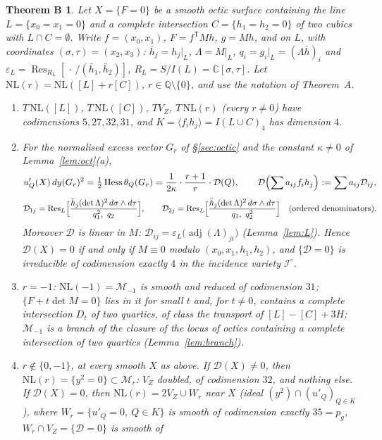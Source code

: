 \documentclass[11pt]{article}
\numberwithin{equation}{section}
\newtheorem*{thmB}{Theorem B}
\theoremstyle{remark}
\newcommand{\CC}{\mathbb{C}}
\newcommand{\QQ}{\mathbb{Q}}
\newcommand{\NL}{\mathrm{NL}}
\newcommand{\VZ}{V_Z}
\newcommand{\cD}{\mathcal{D}}
\newcommand{\cM}{\mathcal{M}}
\newcommand{\cI}{\mathcal{I}}
\newcommand{\Res}{\operatorname{Res}}
\newcommand{\Hess}{\operatorname{Hess}}
\newcommand{\adj}{\operatorname{adj}}
\begin{document}
\begin{thmB}
Let $X=\{F=0\}$ be a smooth octic surface containing the line $L=\{x_0=x_1=0\}$ and a complete intersection
$C=\{h_1=h_2=0\}$ of two cubics with $L\cap C=\emptyset$. Write $f=(x_0,x_1)$, $F=f^{\mathsf T}Mh$, $g=Mh$, and on
$L$, with coordinates $(\sigma,\tau)=(x_2,x_3)$: $\bar h_j=h_j|_L$, $\Lambda=M|_L$,
$q_i=g_i|_L=(\Lambda\bar h)_i$ and $\varepsilon_L=\Res_{R_L}[\,\cdot\,/(\bar h_1,\bar h_2)]$, $R_L=S/I(L)=\CC[\sigma,\tau]$. Let
$\NL(r)=\NL([L]+r[C])$, $r\in\QQ\setminus\{0\}$, and use the notation of Theorem~A.
\begin{enumerate}[label=\textup{(\arabic*)}]
\item $T\,\NL([L])$, $T\,\NL([C])$, $T\VZ$, $T\,\NL(r)$ \textup{(}every $r\ne0$\textup{)} have codimensions
$5,27,32,31$, and $K=\langle f_ih_j\rangle=I(L\cup C)_4$ has dimension $4$.
\item For the normalised excess vector $G_r$ of \S\ref{sec:octic} and the constant $\kappa\neq0$ of
Lemma~\ref{lem:oct}\textup{(a)},
\[
u'_Q(X)\,dy(G_r)^2=\tfrac12\Hess\theta_Q(G_r)=\frac1{2\kappa}\cdot\frac{r+1}{r}\cdot\cD(Q),\qquad
\cD\Bigl(\sum a_{ij}f_ih_j\Bigr):=\sum a_{ij}\cD_{ij},
\]
\[
\cD_{1j}=\Res_L\Bigl[\frac{\bar h_j(\det\Lambda)^2\,d\sigma\wedge d\tau}{q_1^2,\ q_2}\Bigr],\qquad
\cD_{2j}=\Res_L\Bigl[\frac{\bar h_j(\det\Lambda)^2\,d\sigma\wedge d\tau}{q_1,\ q_2^2}\Bigr]
\quad\text{\textup{(}ordered denominators\textup{)}.}
\]
Moreover $\cD$ is linear in $M$: $\cD_{ij}=\varepsilon_L\bigl(\adj(\Lambda)_{ji}\bigr)$
\textup{(}Lemma~\ref{lem:L}\textup{)}. Hence $\cD(X)=0$ if and only if $M\equiv0$ modulo $(x_0,x_1,h_1,h_2)$, and
$\{\cD=0\}$ is irreducible of codimension exactly $4$ in the incidence variety $\cI^\circ$.
\item $r=-1$: $\NL(-1)=\cM_{-1}$ is smooth and reduced of codimension $31$; $\{F+t\det M=0\}$ lies in it for
small $t$ and, for $t\ne0$, contains a complete intersection $D_t$ of two quartics, of class the transport of
$[L]-[C]+3H$; $\cM_{-1}$ is a branch of the closure of the locus of octics containing a complete intersection
of two quartics \textup{(}Lemma~\ref{lem:branch}\textup{)}.
\item $r\notin\{0,-1\}$, at \emph{every} smooth $X$ as above. If $\cD(X)\neq0$, then
$\NL(r)=\{y^2=0\}\subset\cM_r$: $\VZ$ doubled, of codimension $32$, and nothing else. If $\cD(X)=0$, then
$\NL(r)=2\VZ\cup W_r$ near $X$ \textup{(}ideal $(y^2)\cap(u'_Q)_{Q\in K}$\textup{)}, where
$W_r=\{u'_Q=0,\ Q\in K\}$ is smooth of codimension exactly $35=p_g$, $W_r\cap\VZ=\{\cD=0\}$ is smooth of

\end{enumerate}
\end{thmB}
\end{document}

